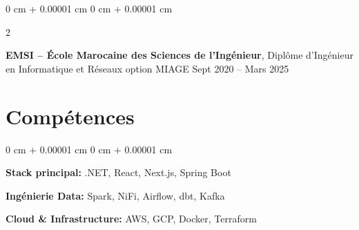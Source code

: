 \documentclass[10pt, letterpaper]{article}
\newenvironment{onecolentry}{
    \begin{adjustwidth}{
        0 cm + 0.00001 cm
    }{
        0 cm + 0.00001 cm
    }
}{
    \end{adjustwidth}
} %
\newenvironment{twocolentry}[2][]{
    \onecolentry
    \def\secondColumn{#2}
    \setcolumnwidth{\fill, 4.5 cm}
    \begin{paracol}{2}
}{
    \switchcolumn \raggedleft \secondColumn
    \end{paracol}
    \endonecolentry
} %
\begin{document}
        
        \begin{twocolentry}{
            Sept 2020 – Mars 2025
        }
            \textbf{EMSI – École Marocaine des Sciences de l’Ingénieur}, Diplôme d’Ingénieur en Informatique et Réseaux option MIAGE \end{twocolentry}




    
    \section{Compétences}



        
        \begin{onecolentry}
            \textbf{Stack principal:} .NET, React, Next.js, Spring Boot

            \vspace{0.1 cm}

            \textbf{Ingénierie Data:} Spark, NiFi, Airflow, dbt, Kafka

            \vspace{0.1 cm}

            \textbf{Cloud \& Infrastructure:} AWS, GCP, Docker, Terraform


        \end{onecolentry}


    
\end{document}
